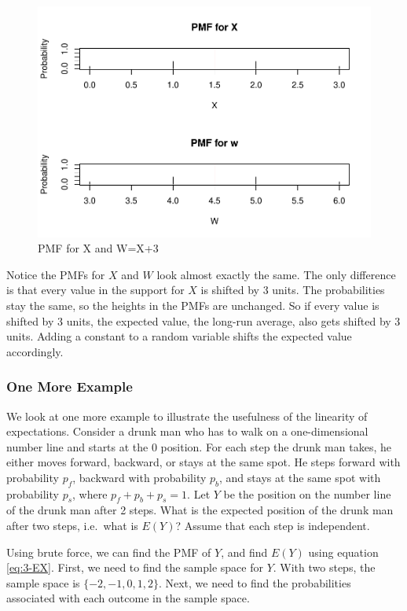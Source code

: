 \documentclass[
]{book}
\begin{document}
\begin{figure}
\centering
\includegraphics{bookdown-demo_files/figure-latex/3-pmf-lin2-1.pdf}
\caption{\label{fig:3-pmf-lin2}PMF for X and W=X+3}
\end{figure}

Notice the PMFs for \(X\) and \(W\) look almost exactly the same. The only difference is that every value in the support for \(X\) is shifted by 3 units. The probabilities stay the same, so the heights in the PMFs are unchanged. So if every value is shifted by 3 units, the expected value, the long-run average, also gets shifted by 3 units. Adding a constant to a random variable shifts the expected value accordingly.

\subsubsection{One More Example}\label{one-more-example}

We look at one more example to illustrate the usefulness of the linearity of expectations. Consider a drunk man who has to walk on a one-dimensional number line and starts at the 0 position. For each step the drunk man takes, he either moves forward, backward, or stays at the same spot. He steps forward with probability \(p_f\), backward with probability \(p_b\), and stays at the same spot with probability \(p_s\), where \(p_f + p_b+p_s = 1\). Let \(Y\) be the position on the number line of the drunk man after 2 steps. What is the expected position of the drunk man after two steps, i.e.~what is \(E(Y)\)? Assume that each step is independent.

Using brute force, we can find the PMF of \(Y\), and find \(E(Y)\) using equation \eqref{eq:3-EX}. First, we need to find the sample space for \(Y\). With two steps, the sample space is \(\{-2,-1,0,1,2\}\). Next, we need to find the probabilities associated with each outcome in the sample space.
\end{document}
